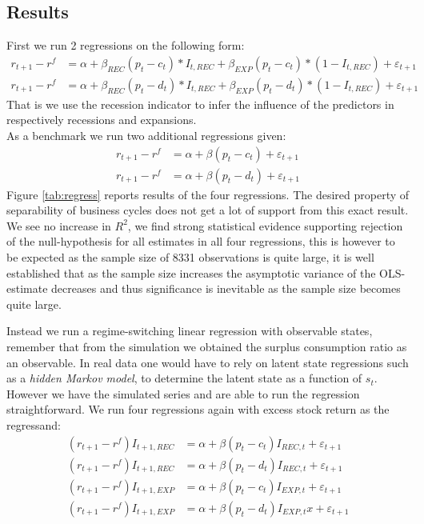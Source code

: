 \subsection{Results}
First we run 2 regressions on the following form:
\begin{align*}
     r_{t+1} - r^{f} &= \alpha + \beta_{REC} \left( p_t - c_t \right) * I_{t,REC} + \beta_{EXP} \left( p_t - c_t \right) * \left(1 - I_{t,REC}\right)  + \varepsilon_{t+1}\\
      r_{t+1} - r^{f} &= \alpha + \beta_{REC} \left( p_t - d_t \right) * I_{t,REC} + \beta_{EXP} \left( p_t - d_t \right) * \left(1 - I_{t,REC}\right)  + \varepsilon_{t+1}
\end{align*}
That is we use the recession indicator to infer the influence of the predictors in respectively recessions and expansions.\\
As a benchmark we run two additional regressions given:
\begin{align*}
     r_{t+1} - r^{f} &= \alpha + \beta \left( p_t - c_t \right)  + \varepsilon_{t+1}\\
      r_{t+1} - r^{f} &= \alpha + \beta \left( p_t - d_t \right) + \varepsilon_{t+1}
\end{align*}
Figure \ref{tab:regress} reports results of the four regressions. The desired property of separability of business cycles does not get a lot of support from this exact result. We see no increase in $R^2$, we find strong statistical evidence supporting rejection of the null-hypothesis for all estimates in all four regressions, this is however to be expected as the sample size of 8331 observations is quite large, it is well established that as the sample size increases the asymptotic variance of the OLS-estimate decreases and thus significance is inevitable as the sample size becomes quite large.



Instead we run a regime-switching linear regression with observable states, remember that from the simulation we obtained the surplus consumption ratio as an observable. In real data one would have to rely on latent state regressions such as a \textit{hidden Markov model}, to determine the latent state as a function of $s_t$.\\
However we have the simulated series and are able to run the regression straightforward. We run four regressions again with excess stock return as the regressand:
\begin{align*}
    \left(r_{t+1} - r^{f}\right) I_{t+1,REC} &=  \alpha + \beta \left( p_t - c_t \right) I_{REC,t} + \varepsilon_{t+1}\\
    \left(r_{t+1} - r^{f}\right)I_{t+1,REC} &=  \alpha + \beta \left( p_t - d_t \right) I_{REC,t} + \varepsilon_{t+1}\\
    \left(r_{t+1} - r^{f}\right)I_{t+1,EXP} &=  \alpha + \beta \left( p_t - c_t \right) I_{EXP,t}  + \varepsilon_{t+1}\\
    \left(r_{t+1} - r^{f}\right)I_{t+1,EXP} &=  \alpha + \beta \left( p_t - d_t \right) I_{EXP,t} x+ \varepsilon_{t+1}
\end{align*}

